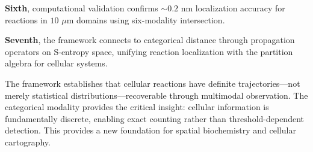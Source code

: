 \documentclass[11pt,a4paper]{article}
\theoremstyle{remark}
\begin{document}
\textbf{Sixth}, computational validation confirms $\sim 0.2$ nm localization accuracy for reactions in $10$ $\mu$m domains using six-modality intersection.

\textbf{Seventh}, the framework connects to categorical distance through propagation operators on S-entropy space, unifying reaction localization with the partition algebra for cellular systems.

The framework establishes that cellular reactions have definite trajectories---not merely statistical distributions---recoverable through multimodal observation. The categorical modality provides the critical insight: cellular information is fundamentally discrete, enabling exact counting rather than threshold-dependent detection. This provides a new foundation for spatial biochemistry and cellular cartography.



\end{document}
